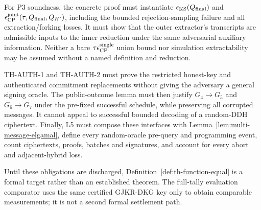 \documentclass[pdflatex,sn-mathphys-num]{sn-jnl}%
\theoremstyle{thmstyleone}%
\theoremstyle{thmstyletwo}%
\theoremstyle{thmstylethree}%
\begin{document}
\begin{appendices}
For P3 soundness, the concrete proof must instantiate
$\epsilon_{\rm KS}(Q_{\rm final})$ and
$\epsilon_{\rm CP}^{\rm joint}(\tau,Q_{\rm final},Q_{H'})$, including the
bounded rejection-sampling failure and all extraction/forking losses.  It must
show that the outer extractor's transcripts are admissible inputs to the inner
reduction under the same adversarial auxiliary information.  Neither a bare
$\tau\epsilon_{\rm CP}^{\rm single}$ union bound nor simulation
extractability may be assumed without a named definition and reduction.

TH-AUTH-1 and TH-AUTH-2 must prove the restricted honest-key and authenticated
commitment replacements without giving the adversary a general signing oracle.
The public-outcome lemma must then justify $G_4\rightarrow G_5$ and
$G_6\rightarrow G_7$ under the pre-fixed successful schedule, while preserving
all corrupted messages.  It cannot appeal to successful bounded decoding of a
random-DDH ciphertext.  Finally, L5 must compose these interfaces with
Lemma~\ref{lem:multi-message-elgamal}, define every random-oracle pre-query and
programming event, count ciphertexts, proofs, batches and signatures, and
account for every abort and adjacent-hybrid loss.

Until these obligations are discharged,
Definition~\ref{def:th-function-equal} is a formal target rather than an
established theorem.  The full-tally evaluation comparator uses the same
certified GJKR-DKG key only to obtain comparable measurements; it is not a
second formal settlement path.


\end{appendices}


\begingroup
{}
\endgroup
\end{document}
